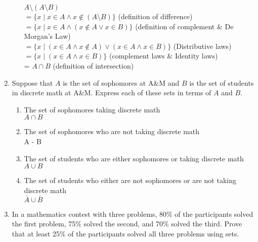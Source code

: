 \documentclass[11pt]{article}
\begin{document}
\begin{enumerate}
\begin{enumerate}
    $A \setminus (A \setminus B)$ \\
$= \{x \mid x \in A \land x \notin (A \setminus B)\}$  
 (definition of difference) \\
 $= \{x \mid x \in A \land (x \notin A \lor x\in  B)\}$ (definition of complement \& De Morgan's Law)\\
$= \{x \mid (x \in A \land x \notin A) \lor (x \in A \land x \in B)\}$ (Distributive laws)\\
$= \{x \mid (x \in A \land x \in B)\}$ (complement laws \& Identity laws)\\
= $A \cap B$ (definition of intersection)\\
  \end{enumerate}

\newpage
\item Suppose that $A$ is the set of sophomores at A\&M and $B$ is the set of students in discrete math at A\&M. Express each of these sets in terms of $A$ and $B$.\\

  \begin{enumerate}
  \item The set of sophomores taking discrete math\\
  $A \cap B$\\
  
  \item The set of sophomores who are not taking discrete math\\
  A - B
  
  \item The set of students who are either sophomores or taking discrete math\\
  $A \cup B$\\
    
  
  \item The set of students who either are not sophomores or are not taking discrete math\\
  $\bar{A} \cup \bar{B}$\\
  
  \end{enumerate}

\newpage
\item In a mathematics contest with three problems, 80\% of the participants solved the first problem, 75\% solved the second, and 70\% solved the third. Prove that at least 25\% of the participants solved all three problems using sets.\\



\end{enumerate}
\end{document}
